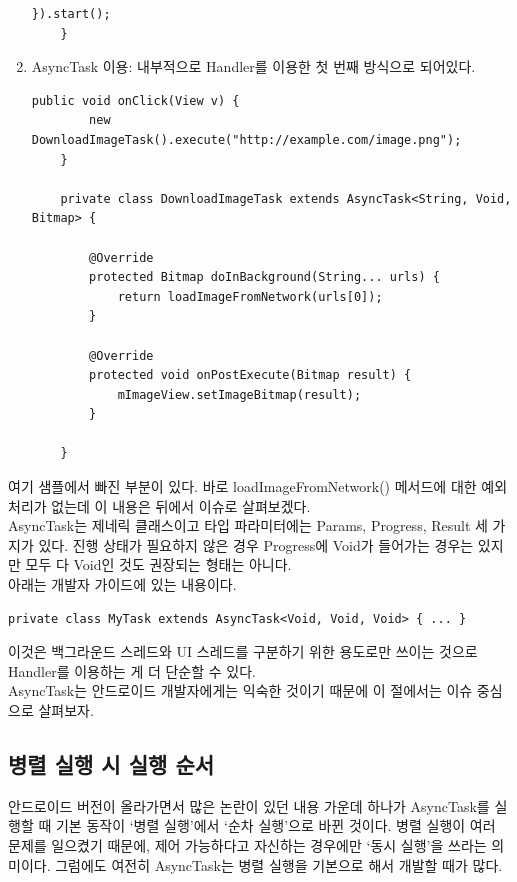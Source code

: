 \begin{enumerate}
\begin{lstlisting}[frame=single]
    	}).start();
	}
\end{lstlisting}
	
\item AsyncTask 이용: 내부적으로 Handler를 이용한 첫 번째 방식으로 되어있다.
\begin{lstlisting}[frame=single]
	public void onClick(View v) {
    	new DownloadImageTask().execute("http://example.com/image.png");
	}

	private class DownloadImageTask extends AsyncTask<String, Void, Bitmap> {
	
		@Override
    	protected Bitmap doInBackground(String... urls) {
        	return loadImageFromNetwork(urls[0]);
    	}

      	@Override
    	protected void onPostExecute(Bitmap result) {
        	mImageView.setImageBitmap(result);
    	}
    	
	}	
\end{lstlisting}
\end{enumerate}
여기 샘플에서 빠진 부분이 있다. 바로 loadImageFromNetwork() 메서드에 대한 예외 처리가 없는데 이 내용은 뒤에서 이슈로 살펴보겠다.\\

AsyncTask는 제네릭 클래스이고 타입 파라미터에는 Params, Progress, Result 세 가지가 있다. 진행 상태가 필요하지 않은 경우 Progress에 Void가 들어가는 경우는 있지만 모두 다 Void인 것도 권장되는 형태는 아니다.\\

아래는 개발자 가이드에 있는 내용이다.
\begin{lstlisting}[frame=single]
private class MyTask extends AsyncTask<Void, Void, Void> { ... }
\end{lstlisting}
이것은 백그라운드 스레드와 UI 스레드를 구분하기 위한 용도로만 쓰이는 것으로 Handler를 이용하는 게 더 단순할 수 있다.\\

AsyncTask는 안드로이드 개발자에게는 익숙한 것이기 때문에 이 절에서는 이슈 중심으로 살펴보자.

\subsection{병렬 실행 시 실행 순서}
안드로이드 버전이 올라가면서 많은 논란이 있던 내용 가운데 하나가 AsyncTask를 실행할 때 기본 동작이 `병렬 실행'에서 `순차 실행'으로 바뀐 것이다. 
병렬 실행이 여러 문제를 일으켰기 때문에, 제어 가능하다고 자신하는 경우에만 `동시 실행'을 쓰라는 의미이다.
그럼에도 여전히 AsyncTask는 병렬 실행을 기본으로 해서 개발할 때가 많다.\\

